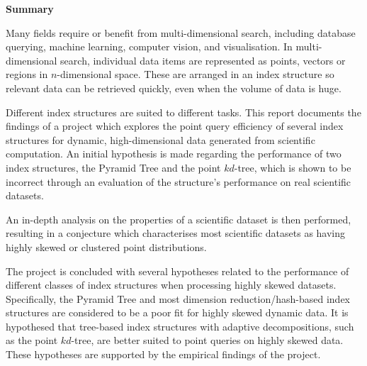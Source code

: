 \begin{center}
    {\LARGE\bf Summary}
\end{center}

Many fields require or benefit from multi-dimensional search, including database querying, machine learning, computer vision, and visualisation. In multi-dimensional search, individual data items are represented as points, vectors or regions in $n$-dimensional space. These are arranged in an index structure so relevant data can be retrieved quickly, even when the volume of data is huge.

Different index structures are suited to different tasks. This report documents the findings of a project which explores the point query efficiency of several index structures for dynamic, high-dimensional data generated from scientific computation. An initial hypothesis is made regarding the performance of two index structures, the Pyramid Tree and the point $kd$-tree, which is shown to be incorrect through an evaluation of the structure's performance on real scientific datasets.

An in-depth analysis on the properties of a scientific dataset is then performed, resulting in a conjecture which characterises most scientific datasets as having highly skewed or clustered point distributions.

The project is concluded with several hypotheses related to the performance of different classes of index structures when processing highly skewed datasets. Specifically, the Pyramid Tree and most dimension reduction/hash-based index structures are considered to be a poor fit for highly skewed dynamic data. It is hypothesed that tree-based index structures with adaptive decompositions, such as the point $kd$-tree, are better suited to point queries on highly skewed data. These hypotheses are supported by the empirical findings of the project.